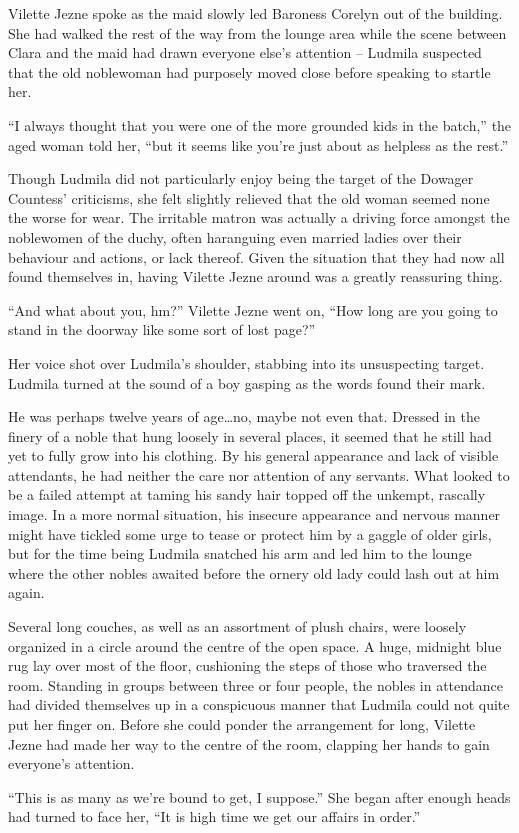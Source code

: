 Vilette Jezne spoke as the maid slowly led Baroness Corelyn out of the building. She had walked the rest of the way from the lounge area while the scene between Clara and the maid had drawn everyone else’s attention – Ludmila suspected that the old noblewoman had purposely moved close before speaking to startle her.

 

“I always thought that you were one of the more grounded kids in the batch,” the aged woman told her, “but it seems like you’re just about as helpless as the rest.”

 

Though Ludmila did not particularly enjoy being the target of the Dowager Countess’ criticisms, she felt slightly relieved that the old woman seemed none the worse for wear. The irritable matron was actually a driving force amongst the noblewomen of the duchy, often haranguing even married ladies over their behaviour and actions, or lack thereof. Given the situation that they had now all found themselves in, having Vilette Jezne around was a greatly reassuring thing.

 

“And what about you, hm?” Vilette Jezne went on, “How long are you going to stand in the doorway like some sort of lost page?”

 

Her voice shot over Ludmila's shoulder, stabbing into its unsuspecting target. Ludmila turned at the sound of a boy gasping as the words found their mark.

 

He was perhaps twelve years of age…no, maybe not even that. Dressed in the finery of a noble that hung loosely in several places, it seemed that he still had yet to fully grow into his clothing. By his general appearance and lack of visible attendants, he had neither the care nor attention of any servants. What looked to be a failed attempt at taming his sandy hair topped off the unkempt, rascally image. In a more normal situation, his insecure appearance and nervous manner might have tickled some urge to tease or protect him by a gaggle of older girls, but for the time being Ludmila snatched his arm and led him to the lounge where the other nobles awaited before the ornery old lady could lash out at him again.

 

Several long couches, as well as an assortment of plush chairs, were loosely organized in a circle around the centre of the open space. A huge, midnight blue rug lay over most of the floor, cushioning the steps of those who traversed the room. Standing in groups between three or four people, the nobles in attendance had divided themselves up in a conspicuous manner that Ludmila could not quite put her finger on. Before she could ponder the arrangement for long, Vilette Jezne had made her way to the centre of the room, clapping her hands to gain everyone’s attention.

 

“This is as many as we’re bound to get, I suppose.” She began after enough heads had turned to face her, “It is high time we get our affairs in order.”